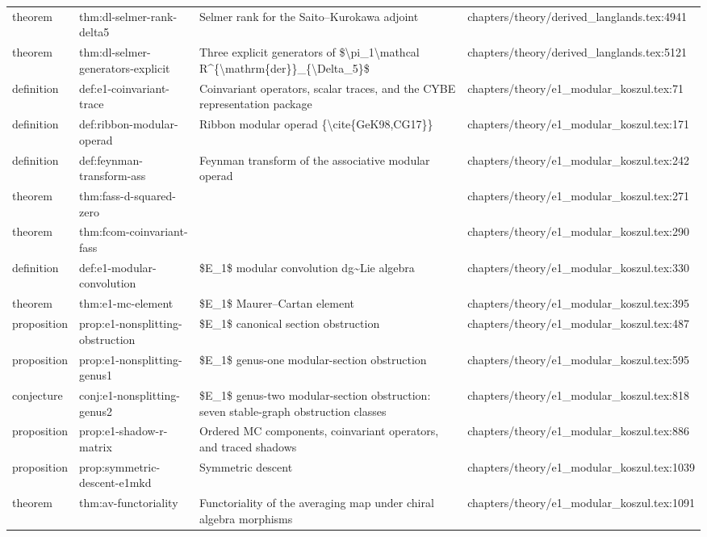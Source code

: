\documentclass[11pt]{article}
\begin{document}
\begin{longtable}{L{0.10\textwidth}L{0.26\textwidth}L{0.42\textwidth}L{0.22\textwidth}}
theorem & thm:dl-selmer-rank-delta5 & Selmer rank for the Saito--Kurokawa adjoint & chapters/theory/derived\_langlands.tex:4941\\
theorem & thm:dl-selmer-generators-explicit & Three explicit generators of \$\textbackslash{}pi\_1\textbackslash{}mathcal R\textasciicircum{}\{\textbackslash{}mathrm\{der\}\}\_\{\textbackslash{}Delta\_5\}\$ & chapters/theory/derived\_langlands.tex:5121\\
definition & def:e1-coinvariant-trace & Coinvariant operators, scalar traces, and the CYBE representation package & chapters/theory/e1\_modular\_koszul.tex:71\\
definition & def:ribbon-modular-operad & Ribbon modular operad \{\textbackslash{}cite\{GeK98,CG17\}\} & chapters/theory/e1\_modular\_koszul.tex:171\\
definition & def:feynman-transform-ass & Feynman transform of the associative modular operad & chapters/theory/e1\_modular\_koszul.tex:242\\
theorem & thm:fass-d-squared-zero &  & chapters/theory/e1\_modular\_koszul.tex:271\\
theorem & thm:fcom-coinvariant-fass &  & chapters/theory/e1\_modular\_koszul.tex:290\\
definition & def:e1-modular-convolution & \$E\_1\$ modular convolution dg\textasciitilde{}Lie algebra & chapters/theory/e1\_modular\_koszul.tex:330\\
theorem & thm:e1-mc-element & \$E\_1\$ Maurer--Cartan element & chapters/theory/e1\_modular\_koszul.tex:395\\
proposition & prop:e1-nonsplitting-obstruction & \$E\_1\$ canonical section obstruction & chapters/theory/e1\_modular\_koszul.tex:487\\
proposition & prop:e1-nonsplitting-genus1 & \$E\_1\$ genus-one modular-section obstruction & chapters/theory/e1\_modular\_koszul.tex:595\\
conjecture & conj:e1-nonsplitting-genus2 & \$E\_1\$ genus-two modular-section obstruction: seven stable-graph obstruction classes & chapters/theory/e1\_modular\_koszul.tex:818\\
proposition & prop:e1-shadow-r-matrix & Ordered MC components, coinvariant operators, and traced shadows & chapters/theory/e1\_modular\_koszul.tex:886\\
proposition & prop:symmetric-descent-e1mkd & Symmetric descent & chapters/theory/e1\_modular\_koszul.tex:1039\\
theorem & thm:av-functoriality & Functoriality of the averaging map under chiral algebra morphisms & chapters/theory/e1\_modular\_koszul.tex:1091\\

\end{longtable}
\end{document}
